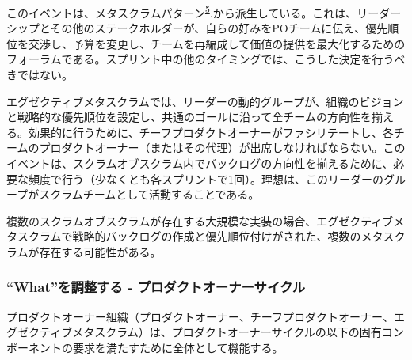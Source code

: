 \documentclass[12pt,a4paper,parskip=full]{scrartcl}
\begin{document}
このイベントは、メタスクラムパターン\textsuperscript{\hyperref[citation5]{5}}.から派生している。これは、リーダーシップとその他のステークホルダーが、自らの好みをPOチームに伝え、優先順位を交渉し、予算を変更し、チームを再編成して価値の提供を最大化するためのフォーラムである。スプリント中の他のタイミングでは、こうした決定を行うべきではない。

エグゼクティブメタスクラムでは、リーダーの動的グループが、組織のビジョンと戦略的な優先順位を設定し、共通のゴールに沿って全チームの方向性を揃える。効果的に行うために、チーフプロダクトオーナーがファシリテートし、各チームのプロダクトオーナー（またはその代理）が出席しなければならない。このイベントは、スクラムオブスクラム内でバックログの方向性を揃えるために、必要な頻度で行う（少なくとも各スプリントで1回）。理想は、このリーダーのグループがスクラムチームとして活動することである。

複数のスクラムオブスクラムが存在する大規模な実装の場合、エグゼクティブメタスクラムで戦略的バックログの作成と優先順位付けがされた、複数のメタスクラムが存在する可能性がある。

\subsubsection{“What”を調整する - プロダクトオーナーサイクル}\label{coordinating-the-what}

プロダクトオーナー組織（プロダクトオーナー、チーフプロダクトオーナー、エグゼクティブメタスクラム）は、プロダクトオーナーサイクルの以下の固有コンポーネントの要求を満たすために全体として機能する。
\end{document}
